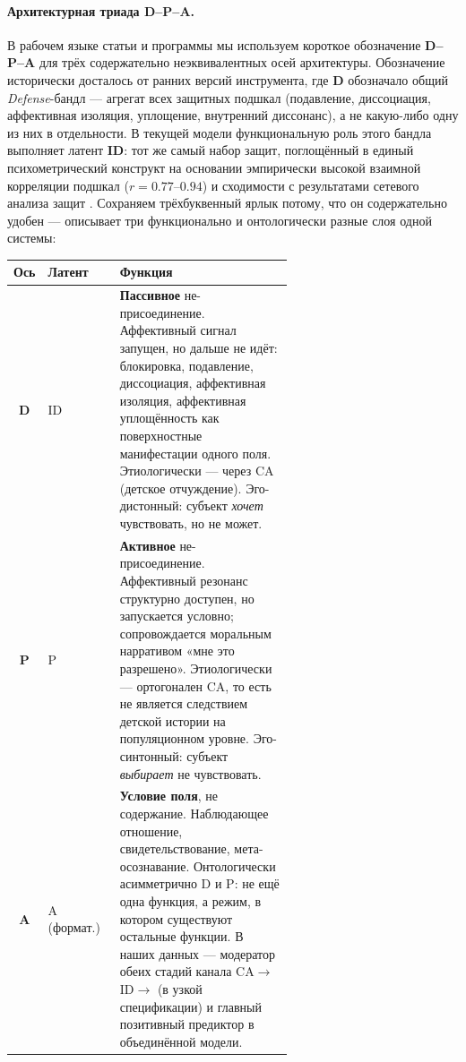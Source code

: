 \paragraph{Архитектурная триада D--P--A.} В рабочем языке статьи и программы мы используем короткое обозначение \textbf{D--P--A} для трёх содержательно неэквивалентных осей архитектуры. Обозначение исторически досталось от ранних версий инструмента, где \textbf{D} обозначало общий \emph{Defense}-бандл --- агрегат всех защитных подшкал (подавление, диссоциация, аффективная изоляция, уплощение, внутренний диссонанс), а не какую-либо одну из них в отдельности. В текущей модели функциональную роль этого бандла выполняет латент \textbf{ID}: тот же самый набор защит, поглощённый в единый психометрический конструкт на основании эмпирически высокой взаимной корреляции подшкал ($r = 0.77$--$0.94$) и сходимости с результатами сетевого анализа защит \citep{digiuseppe2024}. Сохраняем трёхбуквенный ярлык потому, что он содержательно удобен --- описывает три функционально и онтологически разные слоя одной системы:

\begin{center}
\begin{tabular}{clp{0.62\linewidth}}
\toprule
\textbf{Ось} & \textbf{Латент} & \textbf{Функция} \\
\midrule
\textbf{D} & ID & \textbf{Пассивное} не-присоединение. Аффективный сигнал запущен, но дальше не идёт: блокировка, подавление, диссоциация, аффективная изоляция, аффективная уплощённость как поверхностные манифестации одного поля. Этиологически --- через CA (детское отчуждение). Эго-дистонный: субъект \emph{хочет} чувствовать, но не может. \\
\midrule
\textbf{P} & P & \textbf{Активное} не-присоединение. Аффективный резонанс структурно доступен, но запускается условно; сопровождается моральным нарративом «мне это разрешено». Этиологически --- ортогонален CA, то есть не является следствием детской истории на популяционном уровне. Эго-синтонный: субъект \emph{выбирает} не чувствовать. \\
\midrule
\textbf{A} & A (формат.) & \textbf{Условие поля}, не содержание. Наблюдающее отношение, свидетельствование, мета-осознавание. Онтологически асимметрично D и P: не ещё одна функция, а режим, в котором существуют остальные функции. В наших данных --- модератор обеих стадий канала CA$\to$ID$\to$\EAF{} (в узкой спецификации) и главный позитивный предиктор \EAF{} в объединённой модели. \\
\bottomrule
\end{tabular}
\end{center}

